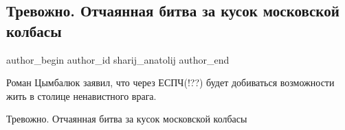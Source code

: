  
 
 
 
 
 
\subsection{Тревожно. Отчаянная битва за кусок московской колбасы}
\label{sec:16_12_2021.fb.sharij_anatolij.1.cimbaljuk}
 
\ifcmt
 author_begin
   author_id sharij_anatolij
 author_end
\fi

Роман Цымбалюк заявил, что через ЕСПЧ(!??) будет добиваться возможности жить в
столице ненавистного врага. 

Тревожно. Отчаянная битва за кусок московской колбасы


